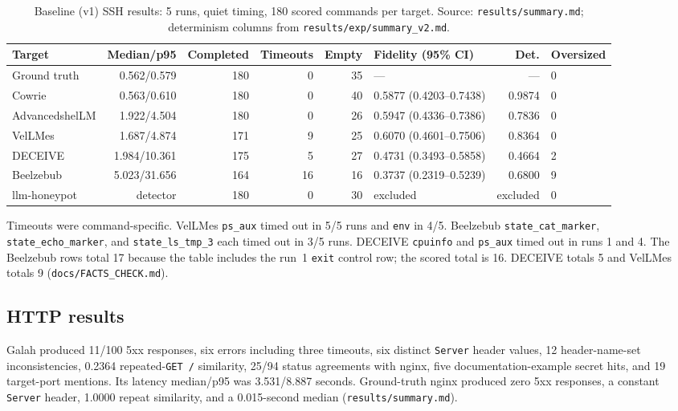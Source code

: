 \documentclass[a4paper,11pt]{article}
\begin{document}
\begin{table}[ht]
\centering
\caption{Baseline (v1) SSH results: 5 runs, quiet timing, 180 scored commands
per target. Source: \texttt{results/summary.md}; determinism columns from
\texttt{results/exp/summary\_v2.md}.}
\label{tab:v1-ssh}
\scriptsize
\setlength{\tabcolsep}{5pt}
\begin{tabularx}{\textwidth}{l r r r r l r l}
\toprule
Target & Median/p95 & Comple\-ted & Time\-outs & Empty & Fidelity (95\% CI) & Det. & Oversized \\
\midrule
Ground truth & 0.562/0.579 & 180 & 0 & 35 & --- & --- & 0 \\
Cowrie & 0.563/0.610 & 180 & 0 & 40 & 0.5877 (0.4203--0.7438) & 0.9874 & 0 \\
AdvancedshelLM & 1.922/4.504 & 180 & 0 & 26 & 0.5947 (0.4336--0.7386) & 0.7836 & 0 \\
VelLMes & 1.687/4.874 & 171 & 9 & 25 & 0.6070 (0.4601--0.7506) & 0.8364 & 0 \\
DECEIVE & 1.984/10.361 & 175 & 5 & 27 & 0.4731 (0.3493--0.5858) & 0.4664 & 2 \\
Beelzebub & 5.023/31.656 & 164 & 16 & 16 & 0.3737 (0.2319--0.5239) & 0.6800 & 9 \\
llm-honeypot & detector & 180 & 0 & 30 & excluded & excluded & 0 \\
\bottomrule
\end{tabularx}
\end{table}

Timeouts were command-specific. VelLMes \texttt{ps\_aux} timed out in 5/5 runs
and \texttt{env} in 4/5. Beelzebub \texttt{state\_cat\_marker},
\texttt{state\_echo\_marker}, and \texttt{state\_ls\_tmp\_3} each timed out in
3/5 runs. DECEIVE \texttt{cpuinfo} and \texttt{ps\_aux} timed out in runs 1
and 4. The Beelzebub rows total 17 because the table includes the run~1
\texttt{exit} control row; the scored total is 16. DECEIVE totals 5 and VelLMes
totals 9 (\texttt{docs/FACTS\_CHECK.md}).

\subsection{HTTP results}

Galah produced 11/100 5xx responses, six errors including three timeouts, six
distinct \texttt{Server} header values, 12 header-name-set inconsistencies,
0.2364 repeated-\texttt{GET /} similarity, 25/94 status agreements with nginx,
five documentation-example secret hits, and 19 target-port mentions. Its
latency median/p95 was 3.531/8.887 seconds. Ground-truth nginx produced zero
5xx responses, a constant \texttt{Server} header, 1.0000 repeat similarity,
and a 0.015-second median (\texttt{results/summary.md}).
\end{document}
